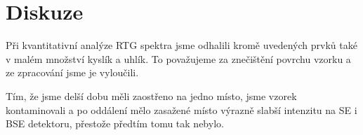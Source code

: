 \section*{Diskuze}
Při kvantitativní analýze RTG spektra jsme odhalili kromě uvedených prvků také v malém množství kyslík a uhlík. To považujeme za znečištění povrchu vzorku a ze zpracování jsme je vyloučili.


Tím, že jsme delší dobu měli zaostřeno na jedno místo, jsme vzorek kontaminovali a po oddálení mělo zasažené místo výrazně slabší intenzitu na SE i BSE detektoru, přestože předtím tomu tak nebylo.